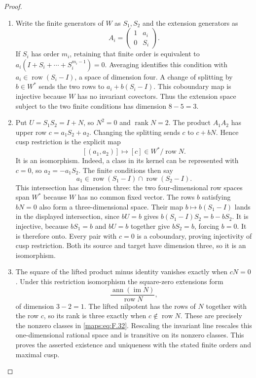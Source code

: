 \begin{proof}
\begin{enumerate}[label=\arabic*.]
\item Write the finite generators of $W$ as $S_1,S_2$ and the
extension generators as
\[
 A_i=\begin{pmatrix}1&a_i\\0&S_i\end{pmatrix}.
\]
If $S_i$ has order $m_i$, retaining that finite order is equivalent
to $a_i(I+S_i+\cdots+S_i^{m_i-1})=0$.  Averaging identifies this
condition with $a_i\in\operatorname{row}(S_i-I)$, a space of
dimension four.  A change of splitting by $b\in W^*$ sends the
two rows to $a_i+b(S_i-I)$.  This coboundary map is injective
because $W$ has no invariant covectors.  Thus the extension
space subject to the two finite conditions has dimension $8-5=3$.

\item Put $U=S_1S_2=I+N$, so $N^2=0$ and $\operatorname{rank}N=2$.
The product $A_1A_2$ has upper row $c=a_1S_2+a_2$.
Changing the splitting sends $c$ to $c+bN$.  Hence cusp restriction
is the explicit map
\[
 [(a_1,a_2)]\longmapsto[c]\in W^*/\operatorname{row}N.
\]
It is an isomorphism.  Indeed, a class in its kernel can be
represented with $c=0$, so $a_2=-a_1S_2$.  The finite conditions
then say
\[
 a_1\in\operatorname{row}(S_1-I)
              \cap\operatorname{row}(S_2-I).
\]
This intersection has dimension three: the two four-dimensional
row spaces span $W^*$ because $W$ has no common fixed vector.
The rows $b$ satisfying $bN=0$ also form a three-dimensional
space.  Their map $b\mapsto b(S_1-I)$ lands in the displayed
intersection, since $bU=b$ gives
$b(S_1-I)S_2=b-bS_2$.  It is injective, because
$bS_1=b$ and $bU=b$ together give $bS_2=b$, forcing $b=0$.
It is therefore onto.  Every pair with $c=0$ is a coboundary,
proving injectivity of cusp restriction.  Both its source and
target have dimension three, so it is an isomorphism.

\item The square of the lifted product minus identity vanishes
exactly when $cN=0$.  Under this restriction isomorphism the
square-zero extensions form
\[
 \frac{\operatorname{ann}(\operatorname{im}N)}
      {\operatorname{row}N},
 \tag{F.32}\label{maps:eq:F.32}
\]
of dimension $3-2=1$.  The lifted nilpotent has the rows of $N$
together with the row $c$, so its rank is three exactly when
$c\notin\operatorname{row}N$.  These are precisely the nonzero
classes in \eqref{maps:eq:F.32}.  Rescaling the invariant line
rescales this one-dimensional rational space and is transitive
on its nonzero classes.  This proves the asserted existence and
uniqueness with the stated finite orders and maximal cusp.
\end{enumerate}
\end{proof}




